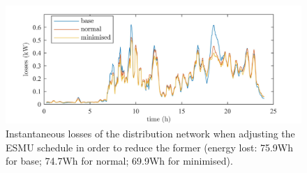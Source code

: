 \begin{figure}\centering
	\includegraphics{_chapter1/fig/results/ts-losses_}
\caption{Instantaneous losses of the distribution network when adjusting the ESMU schedule in order to reduce the former (energy lost: 75.9Wh for base; 74.7Wh for normal; 69.9Wh for minimised).}
\label{ch1:fig:ts-losses}
\end{figure}